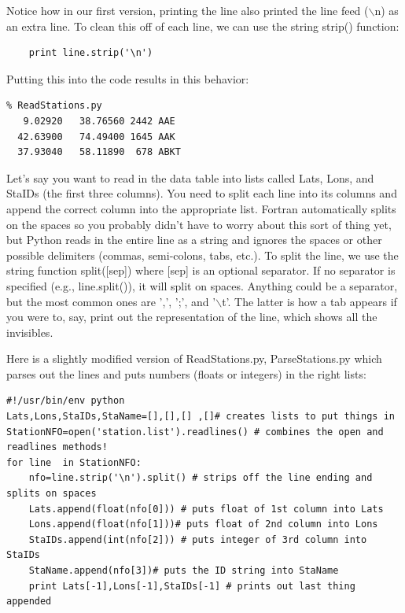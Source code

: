 \documentclass[11pt]{book}
\begin{document}
{  
\noindent Notice how in our first version, printing the line also printed the line feed ($\backslash$n) as an extra line.  To clean this off of each line, we can use the  string {\color{blue}strip()} function:  

{ \color{blue} \begin{verbatim}
    print line.strip('\n')
\end{verbatim}}

\noindent Putting this into the code results in this behavior:

{ \color{blue} \begin{verbatim}
% ReadStations.py
   9.02920   38.76560 2442 AAE 
  42.63900   74.49400 1645 AAK 
  37.93040   58.11890  678 ABKT
\end{verbatim}}


Let's say you want to read in the data table into lists called Lats, Lons, and StaIDs (the first three columns).  You need to split each line into its columns and append the correct column into the appropriate list.  Fortran automatically splits on the spaces so you probably didn't have to worry about this sort of thing yet, but Python reads in the entire line as a string and ignores the spaces or other possible delimiters (commas, semi-colons, tabs, etc.).  To split the line, we use the string function {\color{blue}split([sep])} where {\color{blue}[sep]} is an optional separator.  If no separator is specified (e.g., {\color{blue}line.split()}), it will split on spaces.   Anything could be a separator, but the most common ones are ',', ';', and '$\backslash$t'.  The latter is how a tab appears if you were to, say, print out the representation of the line, which shows all the invisibles.

Here is a slightly modified version of {\color{blue}ReadStations.py}, {\color{blue}ParseStations.py} which parses out the lines and puts numbers (floats or integers) in the right lists:

{ \color{blue} \begin{verbatim}
#!/usr/bin/env python
Lats,Lons,StaIDs,StaName=[],[],[] ,[]# creates lists to put things in
StationNFO=open('station.list').readlines() # combines the open and readlines methods!
for line  in StationNFO:
    nfo=line.strip('\n').split() # strips off the line ending and splits on spaces
    Lats.append(float(nfo[0])) # puts float of 1st column into Lats
    Lons.append(float(nfo[1]))# puts float of 2nd column into Lons
    StaIDs.append(int(nfo[2])) # puts integer of 3rd column into StaIDs
    StaName.append(nfo[3])# puts the ID string into StaName
    print Lats[-1],Lons[-1],StaIDs[-1] # prints out last thing appended
\end{verbatim}}

}
\end{document}
